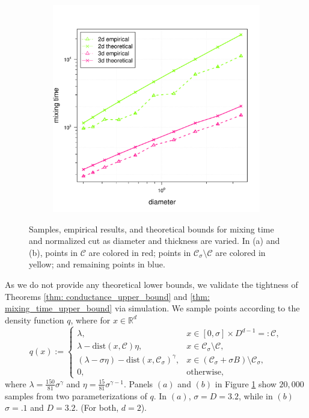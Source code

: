 \documentclass{article}
\newcommand{\Reals}{\mathbb{R}}
\newcommand{\Rd}{\Reals^d}
\newcommand{\1}{\mathbf{1}}
\newcommand{\dist}{\mathrm{dist}}
\newcommand{\Cset}{\mathcal{C}}
\newcommand{\Csig}{\Cset_{\sigma}}
\theoremstyle{aldenthm}
\theoremstyle{aldenrmrk}
\begin{document}
\begin{figure}
\begin{adjustbox}{minipage=\linewidth,scale=0.8}
\begin{subfigure}{.33\linewidth}
		\caption{}
	\end{subfigure}
	\begin{subfigure}{.33\linewidth}
		\includegraphics[width=\linewidth]{example1plots/diameter_mixing_time_plot}
		\caption{}
	\end{subfigure}
	\caption{Samples, empirical results, and theoretical bounds for mixing time and normalized cut as diameter and thickness are varied. In (a) and (b), points in $\Cset$ are colored in red; points in $\Csig \setminus \Cset$ are colored in yellow; and remaining points in blue.}
	\label{fig:fig1}
	\end{adjustbox}
\end{figure}

As we do not provide any theoretical lower bounds, we validate the tightness of Theorems \ref{thm: conductance_upper_bound} and \ref{thm: mixing_time_upper_bound} via simulation.  We sample points according to the density function $q$, where for $x \in \Rd$
\begin{equation}
q(x) :=
\begin{cases}
\lambda,~ & x \in [0,\sigma] \times D^{d-1} =: \Cset, \\
\lambda - \dist(x,\Cset)\eta,~ & x \in \Csig \setminus \Cset, \\
(\lambda - \sigma \eta) - \dist(x,\Csig)^{\gamma}, & x \in (\Csig + \sigma B) \setminus \Csig, \\
0,~ & \textrm{otherwise},
\end{cases}
\end{equation}
where $\lambda = \frac{150}{81} \sigma^{\gamma}$ and $\eta = \frac{15}{81} \sigma^{\gamma - 1}$. Panels $(a)$ and $(b)$ in Figure \ref{fig:fig1} show $20,000$ samples from two parameterizations of $q$. In $(a)$, $\sigma = D = 3.2$, while in $(b)$ $\sigma = .1$ and $D = 3.2$. (For both, $d = 2$).
\end{document}
